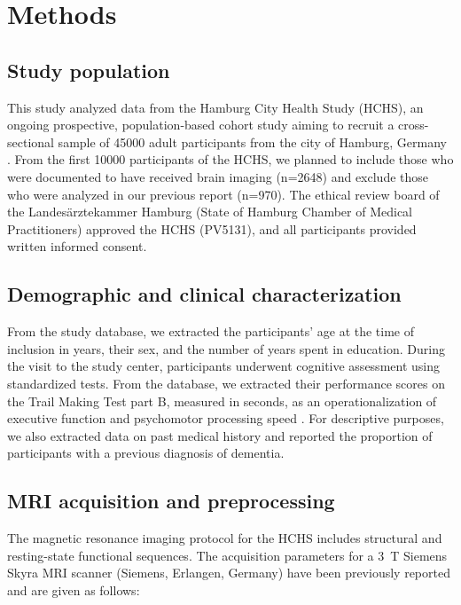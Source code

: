 \section{Methods} \label{methods}

\subsection{Study population}
This study analyzed data from the Hamburg City Health Study (HCHS), an ongoing prospective, population-based cohort study aiming to recruit a cross-sectional sample of \num{45000} adult participants from the city of Hamburg, Germany \citep{Jagodzinski2020-lx}.
From the first \num{10000} participants of the HCHS, we planned to include those who were documented to have received brain imaging (n=2648) and exclude those who were analyzed in our previous report \citep{Schlemm2022-he} (n=970).
The ethical review board of the Landesärztekammer Hamburg (State of Hamburg Chamber of Medical Practitioners) approved the HCHS (PV5131), and all participants provided written informed consent.

\subsection{Demographic and clinical characterization}
From the study database, we extracted the participants’ age at the time of inclusion in years, their sex, and the number of years spent in education.
During the visit to the study center, participants underwent cognitive assessment using standardized tests.
From the database, we extracted their performance scores on the Trail Making Test part B, measured in seconds, as an operationalization of executive function and psychomotor processing speed \citep{Tombaugh2004-dp,arbuthnott2000trail}.
For descriptive purposes, we also extracted data on past medical history and reported the proportion of participants with a previous diagnosis of dementia.

\subsection{MRI acquisition and preprocessing}
The magnetic resonance imaging protocol for the HCHS includes structural and resting-state functional sequences.
The acquisition parameters for a \qty{3}{\tesla} Siemens Skyra MRI scanner (Siemens, Erlangen, Germany) have been previously reported \citep{Petersen2020-cx,Frey2021-sv} and are given as follows:

